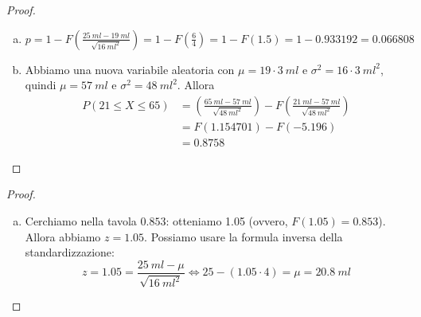 \documentclass{beamer}
\begin{document}
\begin{frame}[fragile]
	\begin{proof}\renewcommand{\qedsymbol}{$\square$}
		\begin{enumerate}[(a)]
			\item $p = 1 - F(\frac{25 \: ml - 19 \: ml}{\sqrt{16 \: ml^2}}) = 1 - F(\frac{6}{4}) = 1 - F(1.5) = 1 - 0.933192 = 0.066808$
			\item Abbiamo una nuova variabile aleatoria con $\mu = 19 \cdot 3 \: ml$ e $\sigma^2 = 16 \cdot 3 \: ml^2$, quindi $\mu = 57 \: ml$ e $\sigma^2 = 48 \: ml^2$. Allora
			      \begin{equation*}
				      \begin{split}
					      P(21 \le X \le 65) & = (\frac{65 \: ml - 57 \: ml}{\sqrt{48 \: ml^2}}) - F(\frac{21 \: ml - 57 \: ml}{\sqrt{48 \: ml^2}}) \\
					      & = F(1.154701) - F(-5.196) \\
						  & = 0.8758
				      \end{split}
			      \end{equation*}
		\end{enumerate}
	\end{proof}
\end{frame}

\begin{frame}[fragile]
	\begin{proof}\renewcommand{\qedsymbol}{$\square$}
		\begin{enumerate}[(c)]
			\item Cerchiamo nella tavola $0.853$: otteniamo 1.05 (ovvero, $F(1.05) = 0.853$). Allora abbiamo $z = 1.05$. Possiamo usare la formula inversa della standardizzazione:
			      \[
				      z = 1.05 = \frac{25 \: ml - \mu}{\sqrt{16 \: ml^2}} \Leftrightarrow 25 -(1.05 \cdot 4) = \mu = 20.8 \: ml
			      \]
		\end{enumerate}
	\end{proof}
\end{frame}
\end{document}
